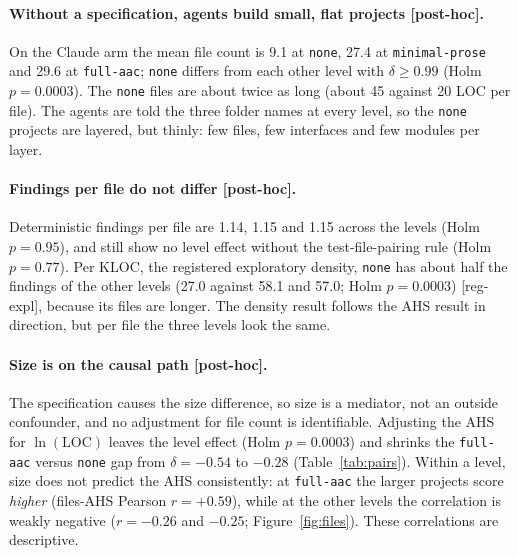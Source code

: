 \documentclass[10pt,a4paper]{article}
\newcommand{\regX}{\textsf{\scriptsize[reg-expl]}}  %
\newcommand{\ph}{\textsf{\scriptsize[post-hoc]}}    %
\newcommand{\lev}[1]{\texttt{\small #1}}
\begin{document}
\paragraph{Without a specification, agents build small, flat projects \ph{}.} On the Claude arm the mean file count
is 9.1 at \lev{none}, 27.4 at \lev{minimal-prose} and 29.6 at \lev{full-aac}; \lev{none} differs from each other
level with $\delta \geq 0.99$ (Holm $p = 0.0003$). %
The \lev{none} files are about twice as long (about 45 against 20 LOC per file). %
The agents are told the three folder names at every level, so the \lev{none} projects are layered, but thinly: few
files, few interfaces and few modules per layer.

\paragraph{Findings per file do not differ \ph{}.} Deterministic findings per file are 1.14, 1.15 and 1.15 across
the levels (Holm $p = 0.95$), and still show no level effect without the test-file-pairing rule (Holm $p = 0.77$).
Per KLOC, the registered exploratory density, \lev{none} has about half the findings of the other levels (27.0
against 58.1 and 57.0; Holm $p = 0.0003$) \regX{}, because its files are longer.
The density result follows the AHS result in direction, but per file the three levels look the same.

\paragraph{Size is on the causal path \ph{}.} The specification causes the size difference, so size is a mediator,
not an outside confounder, and no adjustment for file count is identifiable. %
Adjusting the AHS for $\ln(\mathrm{LOC})$ leaves the level effect (Holm $p = 0.0003$) and shrinks the
\lev{full-aac} versus \lev{none} gap from $\delta = -0.54$ to $-0.28$ (Table~\ref{tab:pairs}).
Within a level, size does not predict the AHS consistently: at \lev{full-aac} the larger projects score
\emph{higher} (files-AHS Pearson $r = +0.59$), while at the other levels the correlation is weakly negative
($r = -0.26$ and $-0.25$; Figure~\ref{fig:files}). These correlations are descriptive.
\end{document}

